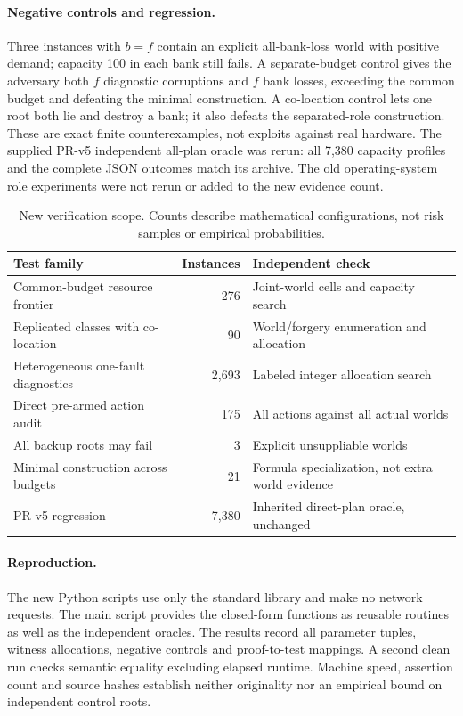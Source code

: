 \documentclass[11pt,a4paper]{article}
\theoremstyle{definition}\newtheorem{definition}{Definition}
\begin{document}
\paragraph{Negative controls and regression.}
Three instances with $b=f$ contain an explicit all-bank-loss world with positive demand; capacity 100 in each bank still fails. A separate-budget control gives the adversary both $f$ diagnostic corruptions and $f$ bank losses, exceeding the common budget and defeating the minimal construction. A co-location control lets one root both lie and destroy a bank; it also defeats the separated-role construction. These are exact finite counterexamples, not exploits against real hardware. The supplied PR-v5 independent all-plan oracle was rerun: all 7,380 capacity profiles and the complete JSON outcomes match its archive. The old operating-system role experiments were not rerun or added to the new evidence count.

\begin{table}[t]
\centering\small
\caption{New verification scope. Counts describe mathematical configurations, not risk samples or empirical probabilities.}
\begin{tabularx}{\linewidth}{@{}XrX@{}}\toprule
Test family&Instances&Independent check\\\midrule
Common-budget resource frontier&276&Joint-world cells and capacity search\\
Replicated classes with co-location&90&World/forgery enumeration and allocation\\
Heterogeneous one-fault diagnostics&2,693&Labeled integer allocation search\\
Direct pre-armed action audit&175&All actions against all actual worlds\\
All backup roots may fail&3&Explicit unsuppliable worlds\\
Minimal construction across budgets&21&Formula specialization, not extra world evidence\\
PR-v5 regression&7,380&Inherited direct-plan oracle, unchanged\\\bottomrule
\end{tabularx}
\end{table}

\paragraph{Reproduction.}
The new Python scripts use only the standard library and make no network requests. The main script provides the closed-form functions as reusable routines as well as the independent oracles. The results record all parameter tuples, witness allocations, negative controls and proof-to-test mappings. A second clean run checks semantic equality excluding elapsed runtime. Machine speed, assertion count and source hashes establish neither originality nor an empirical bound on independent control roots.
\end{document}
